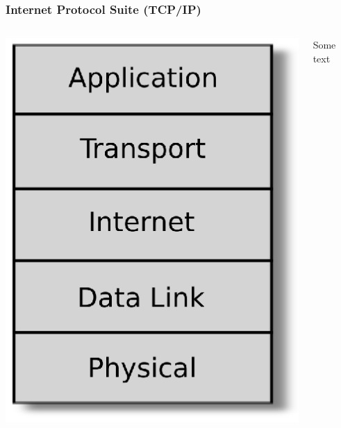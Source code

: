 \documentclass{beamer}
\begin{document}
\begin{frame}
  \frametitle{Internet Protocol Suite (TCP/IP)}
\begin{columns}

 \begin{column}{0.5\textwidth} 
  \begin{center}
  \includegraphics[scale=0.5]{tcpip_stack}
  \end{center}
  \end{column}

 \begin{column}{0.5\textwidth} 
 Some text
  
\end{column}
\end{columns}

\end{frame}
\end{document}
